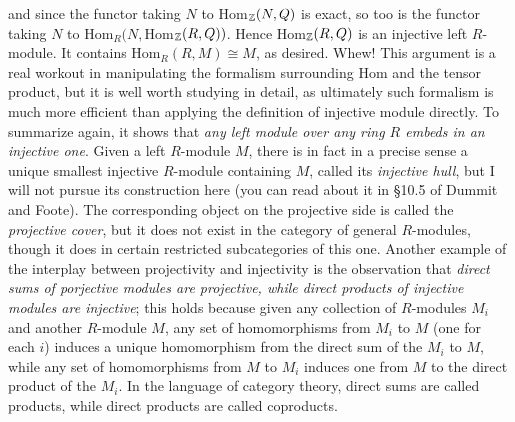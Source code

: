 and since the functor taking $N$ to Hom$_{\Bbb Z}(N,Q)$ is exact, so too is the functor taking
$N$ to Hom$_R(N,$Hom$_{\Bbb Z}(R,Q))$.  Hence Hom$_{\Bbb Z}(R,Q)$ is an injective left
$R$-module.  It contains Hom$_R(R,M)\cong M$, as desired.  Whew!  This argument is a real workout in manipulating the formalism surrounding Hom and the tensor product, but it is well worth studying in detail, as ultimately such formalism is much more efficient than applying the definition of injective module directly.  To summarize again, it shows that {\sl any left module over any ring $R$ embeds in an injective one}.  Given a left $R$-module $M$, there is in fact in a precise sense a unique smallest injective $R$-module containing $M$, called its {\sl injective hull}, but I will not pursue its construction here (you can read about it in \S10.5 of Dummit and Foote).  The corresponding object on the projective side is called the {\sl projective cover}, but it does not exist in the category of general $R$-modules, though it does in certain restricted subcategories of this one.  Another example of the interplay between projectivity and injectivity is the observation that {\sl direct sums of porjective modules are projective, while direct products of injective modules are injective}; this holds because given any collection of $R$-modules $M_i$ and another $R$-module $M$, any set of homomorphisms from $M_i$ to $M$ (one for each $i$) induces a unique homomorphism from the direct sum of the $M_i$ to $M$, while any set of homomorphisms from $M$ to $M_i$ induces one from $M$ to the direct product of the $M_i$.  In the language of category theory, direct sums are called products, while direct products are called coproducts.